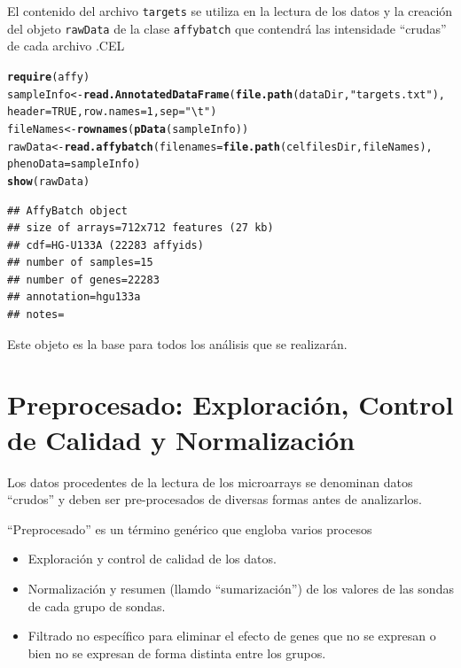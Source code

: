 \documentclass[a4paper]{article}\usepackage[]{graphicx}\usepackage[]{color}
\makeatletter
\newcommand{\hlnum}[1]{\textcolor[rgb]{0.686,0.059,0.569}{#1}}%
\newcommand{\hlstr}[1]{\textcolor[rgb]{0.192,0.494,0.8}{#1}}%
\newcommand{\hlstd}[1]{\textcolor[rgb]{0.345,0.345,0.345}{#1}}%
\newcommand{\hlkwb}[1]{\textcolor[rgb]{0.69,0.353,0.396}{#1}}%
\newcommand{\hlkwc}[1]{\textcolor[rgb]{0.333,0.667,0.333}{#1}}%
\newcommand{\hlkwd}[1]{\textcolor[rgb]{0.737,0.353,0.396}{\textbf{#1}}}%
\newenvironment{kframe}{%
 \def\at@end@of@kframe{}%
 \ifinner\ifhmode%
  \def\at@end@of@kframe{\end{minipage}}%
  \begin{minipage}{\columnwidth}%
 \fi\fi%
 \def\FrameCommand##1{\hskip\@totalleftmargin \hskip-\fboxsep
 \colorbox{shadecolor}{##1}\hskip-\fboxsep
     \hskip-\linewidth \hskip-\@totalleftmargin \hskip\columnwidth}%
 \MakeFramed {\advance\hsize-\width
   \@totalleftmargin\z@ \linewidth\hsize
   \@setminipage}}%
 {\par\unskip\endMakeFramed%
 \at@end@of@kframe}
\newenvironment{knitrout}{}{} %
\makeatother
\begin{document}
El contenido del archivo \texttt{targets} se utiliza en la lectura de los datos y la creación del objeto \texttt{rawData} de la clase \texttt{affybatch} que contendrá las intensidade ``crudas'' de cada archivo .CEL

\begin{knitrout}
\color{fgcolor}\begin{kframe}
\begin{alltt}
\hlkwd{require}\hlstd{(affy)}
\hlstd{sampleInfo} \hlkwb{<-} \hlkwd{read.AnnotatedDataFrame}\hlstd{(}\hlkwd{file.path}\hlstd{(dataDir,}\hlstr{"targets.txt"}\hlstd{),}
    \hlkwc{header} \hlstd{=} \hlnum{TRUE}\hlstd{,} \hlkwc{row.names} \hlstd{=} \hlnum{1}\hlstd{,} \hlkwc{sep}\hlstd{=}\hlstr{"\textbackslash{}t"}\hlstd{)}
\hlstd{fileNames} \hlkwb{<-} \hlkwd{rownames}\hlstd{(}\hlkwd{pData}\hlstd{(sampleInfo))}
\hlstd{rawData} \hlkwb{<-} \hlkwd{read.affybatch}\hlstd{(}\hlkwc{filenames}\hlstd{=}\hlkwd{file.path}\hlstd{(celfilesDir,fileNames),}
                          \hlkwc{phenoData}\hlstd{=sampleInfo)}
\hlkwd{show}\hlstd{(rawData)}
\end{alltt}


{\ttfamily\noindent\itshape\color{messagecolor}{\#\# }}\begin{verbatim}
## AffyBatch object
## size of arrays=712x712 features (27 kb)
## cdf=HG-U133A (22283 affyids)
## number of samples=15
## number of genes=22283
## annotation=hgu133a
## notes=
\end{verbatim}
\end{kframe}
\end{knitrout}

Este objeto es la base para todos los análisis que se realizarán.


\section{Preprocesado: Exploración, Control de Calidad y Normalización}

Los datos procedentes de la lectura de los microarrays se denominan datos ``crudos'' y deben ser pre-procesados de diversas formas antes de analizarlos.

``Preprocesado'' es un término genérico que engloba varios procesos
\begin{itemize}
\item Exploración y control de calidad de los datos.
\item Normalización y resumen (llamdo ``sumarización'') de los valores de las sondas de cada grupo de sondas.
\item Filtrado no específico para eliminar el efecto de genes que no se expresan o bien no se expresan de forma distinta entre los grupos.
\end{itemize}
\end{document}
